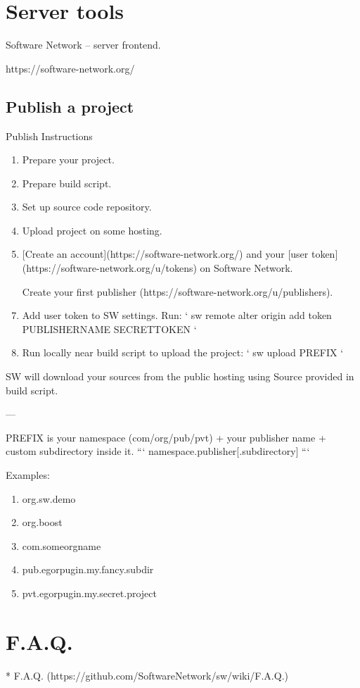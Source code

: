 

\chapter{Server tools}

Software Network -- server frontend.

https://software-network.org/

\section{Publish a project}

Publish Instructions

\begin{enumerate}

\item
Prepare your project.

\item
Prepare build script.

\item
Set up source code repository.

\item
Upload project on some hosting.

\item

[Create an account](https://software-network.org/) and your [user token](https://software-network.org/u/tokens) on Software Network.

\item
[Create your first publisher](https://software-network.org/u/publishers).

\item
Add user token to SW settings. Run:
`
sw remote alter origin add token PUBLISHERNAME SECRETTOKEN
`

\item
Run locally near build script to upload the project:
`
sw upload PREFIX
`

\end{enumerate}


SW will download your sources from the public hosting using Source provided in build script.

---

PREFIX is your namespace (com/org/pub/pvt) + your publisher name + custom subdirectory inside it.
```
namespace.publisher[.subdirectory]
```

Examples:
\begin{enumerate}
\item
org.sw.demo
\item
org.boost
\item
com.someorgname
\item
pub.egorpugin.my.fancy.subdir
\item
pvt.egorpugin.my.secret.project
\end{enumerate}













\chapter*{F.A.Q.}



* F.A.Q. (https://github.com/SoftwareNetwork/sw/wiki/F.A.Q.)